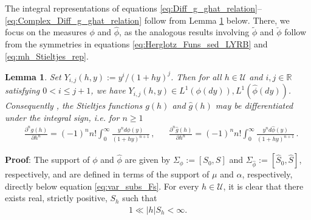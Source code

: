 \documentclass[english,12pt,jmp,graphicx]{revtex4-1}
\newtheorem{lemma}{Lemma}[section]
\newcommand{\ph}{\hat{\phi}}
\begin{document}
The integral representations of equations
\eqref{eq:Diff_g_ghat_relation}--\eqref{eq:Complex_Diff_g_ghat_relation}
follow from Lemma \ref{lem:L1_Yij} below. There, we focus on the
measures $\phi$ and $\ph$, as the analogous results involving $\tilde{\phi}$
and $\check{\phi}$ follow from the symmetries in equations
\eqref{eq:Herglotz_Funs_sed_LYRB} and \eqref{eq:mh_Stieltjes_rep}. 

\begin{lemma}\label{lem:L1_Yij}  
  Set $Y_{i,j}(h,y):=y^i/(1+hy)^j$. Then for all $h\in\mathcal{U}$ and
  $i,j\in\mathbb{R}$ satisfying $0<i\leq j+1$, we have
  $Y_{i,j}(h,y)\in L^1(\phi(dy)),L^1(\ph(dy))$. Consequently
  \cite{Folland:95},
  the Stieltjes functions $g(h)$ and $\hat{g}(h)$ may be
  differentiated under the integral sign, i.e. for $n\geq1$
  \begin{align}\label{eq:Integral_rep_g_ghat}
    &\frac{\partial^ng(h)}{\partial h^n}%
                     =(-1)^nn!\int_0^\infty\frac{y^nd\phi(y)}{(1+hy)^{n+1}}\,,
         &&
    \frac{\partial^n\hat{g}(h)}{\partial h^n}%
                     =(-1)^nn!\int_0^\infty\frac{y^nd\ph(y)}{(1+hy)^{n+1}}\,.
  \end{align}
\end{lemma}
%
%
\noindent \textbf{Proof}:
%
The support of $\phi$ and $\ph$ are given by $\Sigma_\phi:=[S_0,S]$ and
$\Sigma_{\ph}:=[\hat{S}_0,\hat{S}]$, 
respectively, and are defined in terms of the support of $\mu$ and $\alpha$,
respectively, directly below equation \eqref{eq:var_subs_Fs}. For
every $h\in\mathcal{U}$, it is clear that there exists real, strictly
positive, $S_h$ such that   
%
\begin{align}\label{eq:S1_asymp}
  1\ll|h|S_h<\infty.
\end{align}
%
\end{document}
